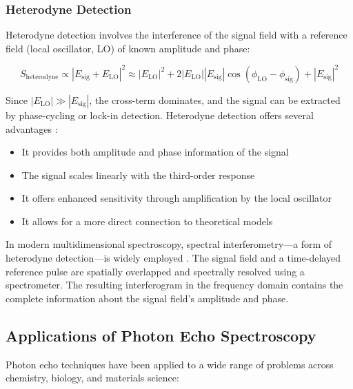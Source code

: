 \subsubsection{Heterodyne Detection}
\label{subsubsec:heterodyne}

\noindent Heterodyne detection involves the interference of the signal field with a reference field (local oscillator, LO) of known amplitude and phase:

\begin{equation}
    S_{\text{heterodyne}} \propto |E_{\text{sig}} + E_{\text{LO}}|^2 \approx |E_{\text{LO}}|^2 + 2|E_{\text{LO}}||E_{\text{sig}}|\cos(\phi_{\text{LO}} - \phi_{\text{sig}}) + |E_{\text{sig}}|^2
    \label{eq:heterodyne}
\end{equation}

\noindent Since $|E_{\text{LO}}| \gg |E_{\text{sig}}|$, the cross-term dominates, and the signal can be extracted by phase-cycling or lock-in detection. Heterodyne detection offers several advantages \cite{Lepetit1995}:

\begin{itemize}
    \item It provides both amplitude and phase information of the signal
    \item The signal scales linearly with the third-order response
    \item It offers enhanced sensitivity through amplification by the local oscillator
    \item It allows for a more direct connection to theoretical models
\end{itemize}

\noindent In modern multidimensional spectroscopy, spectral interferometry—a form of heterodyne detection—is widely employed \cite{Hybl1998}. The signal field and a time-delayed reference pulse are spatially overlapped and spectrally resolved using a spectrometer. The resulting interferogram in the frequency domain contains the complete information about the signal field's amplitude and phase.

\subsection{Applications of Photon Echo Spectroscopy}
\label{subsec:echo_applications}

\noindent Photon echo techniques have been applied to a wide range of problems across chemistry, biology, and materials science:

